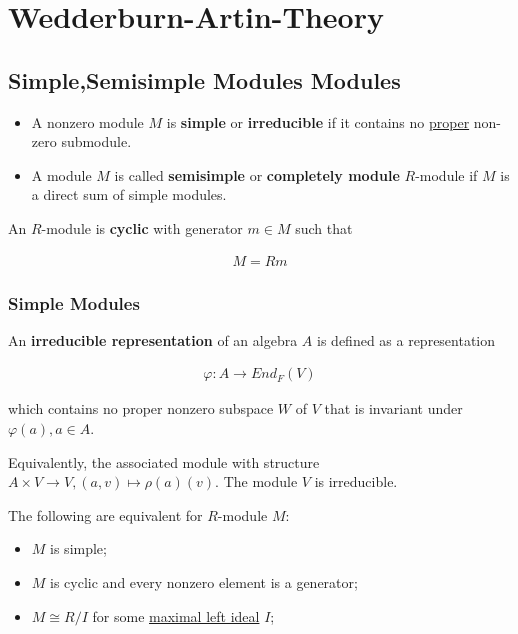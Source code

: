 \documentclass[Total.tex]{subfiles}
\begin{document}
	\chapter{Wedderburn-Artin-Theory}
	\section{Simple,Semisimple Modules Modules}
	
	\begin{Def}
		
		\begin{itemize}
			\item 
			\label{simple-module}\label{irreducible-module}  A nonzero module $M$ is \textbf{simple} or \textbf{irreducible} if it contains no \underline{proper} non-zero submodule.
			
			\item \label{semisimple-module}\label{completely- module} A module $M$ is called \textbf{semisimple} or \textbf{completely module} $R$-module if $M$ is a direct sum of simple modules. 
		\end{itemize} 
	\end{Def}
	
	\begin{Def}
		An $R$-module is \textbf{cyclic} with generator $m\in M$ such that
		
		\begin{gather*}
			M=Rm
		\end{gather*} 
	\end{Def}
	
	\subsection{Simple Modules}
	
	\begin{Def}
		An \textbf{irreducible representation} of an algebra $A$ is defined as a representation
		
		\begin{gather*}
			\varphi:A\rightarrow End_F(V)
		\end{gather*}
		
		which contains no proper nonzero subspace $W$ of $V$ that is invariant under $\varphi(a),a\in A$.
	\end{Def}
	
	Equivalently, the associated module with structure $A\times V\rightarrow V,(a,v)\mapsto \rho(a)(v)$. The module $V$ is irreducible. 
	
	\begin{proposition}
		The following are equivalent for $R$-module $M$:
		
		\begin{itemize}
			\item $M$ is simple;
			\item $M$ is cyclic and every nonzero element is a generator;
			\item $M\cong R/I$ for some \underline{maximal left ideal} $I$;
		\end{itemize}
	\end{proposition}
	
\end{document}
